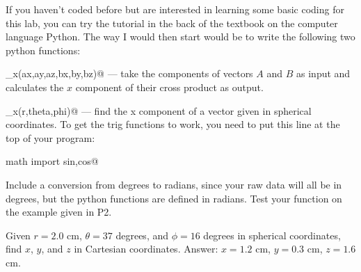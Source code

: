 If you haven't coded before but are interested in
learning some basic coding for this lab, you can try the tutorial in the back of
the textbook on the computer language Python.
The way I would then start would be to  write the following two python functions:

\verb@cross_x(ax,ay,az,bx,by,bz)@ --- 
take the components of vectors $A$ and $B$ as input and calculates the $x$ component of their cross product as output.

\verb@cart_x(r,theta,phi)@ ---
find the x component of a vector given in spherical coordinates.
To get the trig functions to work, you need to put
this line at the top of your program:

\verb@from math import sin,cos@

Include a conversion from degrees to radians, since
your raw data will all be in degrees, but the python functions are defined in radians. Test your function on the example
given in P2.

\prelab

\prelabquestion Given $r=2.0$ cm, $\theta=37$ degrees, and $\phi=16$ degrees in spherical coordinates, find $x$, $y$, and $z$
in Cartesian coordinates. Answer: $x=1.2$ cm, $y=0.3$ cm, $z=1.6$ cm.
